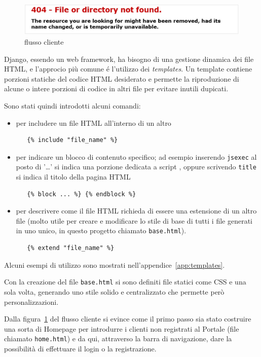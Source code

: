 \begin{figure}
 \includegraphics[width=1\textwidth]{images/filenotfound} 
 \caption{flusso cliente}
 \label{fig:flusso-cliente}
\end{figure}

Django, essendo un web framework, ha bisogno di una gestione dinamica dei file HTML, e l'approcio più comune é l'utilizzo dei \emph{templates}.
Un template contiene porzioni statiche del codice HTML desiderato e permette la riproduzione di alcune o intere porzioni di codice in altri file per evitare inutili dupicati.

Sono stati quindi introdotti alcuni comandi:
\begin{itemize}
 \item per includere un file HTML all'interno di un altro
  \begin{verbatim} 
   {% include "file_name" %} 
  \end{verbatim}
 \item per indicare un blocco di contenuto specifico; ad esempio inserendo \texttt{jsexec} al posto di '{\dots}' si indica una porzione dedicata a script {\js}, oppure scrivendo \texttt{title} si indica il titolo della pagina HTML
  \begin{verbatim} 
   {% block ... %} {% endblock %}
  \end{verbatim}
 \item per descrivere come il file HTML richieda di essere una estensione di un altro file (molto utile per creare e modificare lo stile di base di tutti i file generati in uno unico, in questo progetto chiamato \texttt{base.html}).
  \begin{verbatim} 
   {% extend "file_name" %} 
  \end{verbatim} 
\end{itemize}
Alcuni esempi di utilizzo sono mostrati nell'appendice~\ref{app:templates}.

Con la creazione del file \texttt{base.html} si sono definiti file statici come CSS e {\js} una sola volta, generando uno stile solido e centralizzato che permette però personalizzazioni.

Dalla figura~\ref{fig:flusso-cliente} del flusso cliente si evince come il primo passo sia stato costruire una sorta di Homepage per introdurre i clienti non registrati al Portale (file chiamato \texttt{home.html}) e da qui, attraverso la barra di navigazione, dare la possibilità di effettuare il login o la registrazione.

